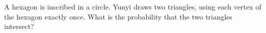 A hexagon is inscribed in a circle. Yunyi draws two triangles, using each vertex of the hexagon exactly once. What is the probability that the two triangles intersect?
